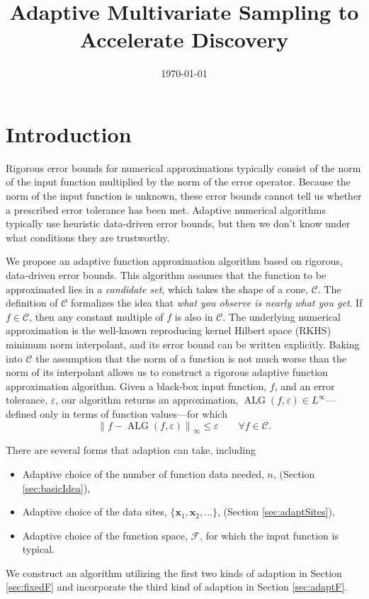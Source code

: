 \documentclass[]{mcom-l}
\title{Adaptive Multivariate Sampling to Accelerate Discovery}
\author{}
\date{\today}
\theoremstyle{remark}
\DeclareMathOperator{\ALG}{ALG}
\newcommand{\bx}{{\boldsymbol{x}}}
\newcommand{\cc}{\mathcal{C}}
\newcommand{\calf}{{\mathcal{F}}}
\newcommand{\norm}[2][{}]{\ensuremath{\left \lVert #2 \right \rVert}_{#1}}
\begin{document}
\maketitle

\section{Introduction}
Rigorous error bounds for numerical approximations typically consist of the norm of the input function multiplied by the norm of the error operator.  Because the norm of the input function is unknown, these error bounds cannot tell us whether a prescribed error tolerance has been met.  Adaptive numerical algorithms typically use heuristic data-driven error bounds, but then we don't know under what conditions they are trustworthy.

We propose an adaptive function approximation algorithm based on rigorous, data-driven error bounds.  This algorithm assumes that the function to be approximated lies in a \emph{candidate set}, which takes the shape of a cone, $\cc$.  The definition of $\cc$ formalizes the idea that \emph{what you observe is nearly what you get}.  If $f \in \cc$, then any constant multiple of $f$ is also in $\cc$.  The underlying numerical approximation is the well-known reproducing kernel Hilbert space (RKHS) minimum norm interpolant, and its error bound can be written explicitly.  Baking into $\cc$ the assumption that the norm of a function is not much worse than the norm of its interpolant allows us to construct a rigorous adaptive function approximation algorithm. Given a black-box input function, $f$, and an error tolerance, $\varepsilon$, our algorithm returns an approximation, $\ALG(f,\varepsilon) \in L^\infty$---defined only in terms of function values---for which 
\begin{equation} \label{eq:errorcrit}
\norm[\infty]{f - \ALG(f,\varepsilon)} \le \varepsilon \qquad \forall f\in \cc.
\end{equation}

There are several forms that adaption can take, including
\begin{itemize}
    \item Adaptive choice of the number of function data needed, $n$, (Section \ref{sec:basicIdea}),
    \item Adaptive choice of the data sites, $\{\bx_1, \bx_2, \ldots\}$,  (Section \ref{sec:adaptSites}),
    \item Adaptive choice of the function space, $\calf$, for which the input function is typical.
\end{itemize}
We construct an algorithm utilizing the first two kinds of adaption in Section \ref{sec:fixedF} and incorporate the third kind of adaption in Section \ref{sec:adaptF}.
\end{document}
